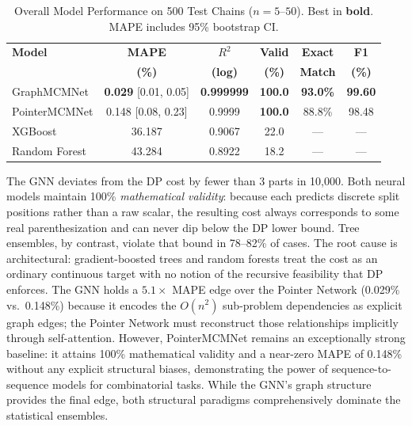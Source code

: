 \documentclass[conference]{IEEEtran}
\begin{document}
\medskip
\begin{table}[htbp]
\caption{Overall Model Performance on 500 Test Chains ($n{=}5$--$50$). Best in \textbf{bold}. MAPE includes 95\% bootstrap CI.}
\label{tab:overall}
\begin{center}
\renewcommand{\arraystretch}{1.3}
\setlength{\tabcolsep}{5pt}
\begin{tabular}{|l|c|c|c|c|c|}
\hline
\textbf{Model} & \textbf{MAPE} & \textbf{$R^2$} & \textbf{Valid} & \textbf{Exact} & \textbf{F1} \\
               & \textbf{(\%)} & \textbf{(log)} & \textbf{(\%)}  & \textbf{Match} & \textbf{(\%)} \\
\hline
GraphMCMNet   & \textbf{0.029} \scriptsize{[0.01, 0.05]} & \textbf{0.999999} & \textbf{100.0} & \textbf{93.0\%} & \textbf{99.60} \\
PointerMCMNet & 0.148 \scriptsize{[0.08, 0.23]}          & 0.9999          & \textbf{100.0} & 88.8\%          & 98.48          \\
XGBoost       & 36.187         & 0.9067          & 22.0           & ---             & ---            \\
Random Forest & 43.284         & 0.8922          & 18.2           & ---             & ---            \\
\hline
\end{tabular}
\end{center}
\end{table}

\medskip
The GNN deviates from the DP cost by fewer than 3 parts in 10,000. Both neural models maintain 100\% \emph{mathematical validity}: because each predicts discrete split positions rather than a raw scalar, the resulting cost always corresponds to some real parenthesization and can never dip below the DP lower bound. Tree ensembles, by contrast, violate that bound in 78--82\% of cases. The root cause is architectural: gradient-boosted trees and random forests treat the cost as an ordinary continuous target with no notion of the recursive feasibility that DP enforces. The GNN holds a $5.1{\times}$ MAPE edge over the Pointer Network (0.029\% vs.\ 0.148\%) because it encodes the $O(n^2)$ sub-problem dependencies as explicit graph edges; the Pointer Network must reconstruct those relationships implicitly through self-attention. However, PointerMCMNet remains an exceptionally strong baseline: it attains 100\% mathematical validity and a near-zero MAPE of 0.148\% without any explicit structural biases, demonstrating the power of sequence-to-sequence models for combinatorial tasks. While the GNN's graph structure provides the final edge, both structural paradigms comprehensively dominate the statistical ensembles.
\end{document}
